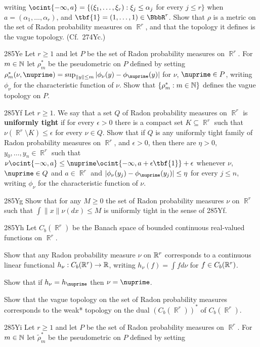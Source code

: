 {\noindent writing $\ocint{-\infty,a}
=\{(\xi_1,\ldots,\xi_r):\xi_j\le\alpha_j$ for every $j\le r\}$
when $a=(\alpha_1,\ldots,\alpha_r)$, and
$\tbf{1}=(1,\ldots,1)\in\BbbR^r$.   Show that $\rho$ is a metric on the
set of Radon probability measures on $\BbbR^r$, and that the topology it
defines is the vague topology.   (Cf.\ 274Yc.)

\spheader 285Ye Let $r\ge 1$ and let $P$ be the set of Radon
probability measures on $\BbbR^r$.   For $m\in\Bbb N$ let $\rho^*_m$ be
the pseudometric on $P$ defined by setting
$\rho^*_m(\nu,\nuprime)=\sup_{\|y\|\le m}|\phi_{\nu}(y)-\phi_{\nuprime}(y)|$
for $\nu$, $\nuprime\in P$, writing $\phi_{\nu}$ for the
characteristic function of $\nu$.   Show that $\{\rho^*_m:m\in\Bbb N\}$
defines the vague topology on $P$.

\spheader 285Yf Let $r\ge 1$.   We say that a set $Q$ of Radon
probability measures on $\BbbR^r$ is {\bf uniformly tight} if for every
$\epsilon>0$ there is a compact set $K\subseteq\BbbR^r$ such that
$\nu(\BbbR^r\setminus K)\le\epsilon$ for every $\nu\in Q$.
Show that if $Q$ is any uniformly tight family of Radon probability
measures on $\BbbR^r$, and $\epsilon>0$, then there are $\eta>0$,
$y_0,\ldots,y_n\in\BbbR^r$ such that
$\nu\ocint{-\infty,a}\le\nuprime\ocint{-\infty,a+\epsilon\tbf{1}}+\epsilon$
whenever $\nu$, $\nuprime\in Q$ and $a\in\BbbR^r$ and
$|\phi_{\nu}(y_j)-\phi_{\nuprime}(y_j)|\le\eta$ for every $j\le n$, writing
$\phi_{\nu}$ for the characteristic function of $\nu$.

\spheader 285Yg Show that for any $M\ge 0$ the set of Radon
probability measures $\nu$ on $\BbbR^r$ such that
$\int\|x\|\nu(dx)\le M$ is uniformly tight in the sense of 285Yf.

\spheader 285Yh Let $C_b(\BbbR^r)$ be the Banach space of
bounded continuous real-valued functions on $\BbbR^r$.

 Show that any Radon probability measure $\nu$ on
$\Bbb R^r$ corresponds to a continuous linear functional
$h_{\nu}:C_b(\Bbb R^r)\to\Bbb R$, writing $h_{\nu}(f)=\int fd\nu$ for
$f\in C_b(\Bbb R^r)$.

 Show that if $h_{\nu}=h_{\nuprime}$ then $\nu=\nuprime$.

 Show that the vague topology on the set of Radon
probability measures corresponds to the weak* topology on the dual
$(C_b(\BbbR^r))^*$ of $C_b(\BbbR^r)$.

\spheader 285Yi Let $r\ge 1$ and let $P$ be the set of Radon
probability measures on $\BbbR^r$.   For $m\in\Bbb N$ let
$\tilde\rho^*_m$ be the pseudometric on $P$ defined by setting

}
